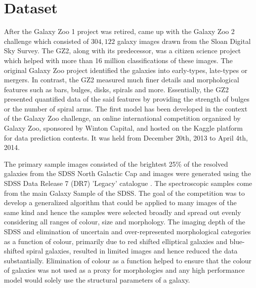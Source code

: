 \documentclass[fleqn,usenatbib]{mnras}
\begin{document}
\section{Dataset}
\hspace{0.25 in}After the Galaxy Zoo 1 \citep{2008MNRAS.389.1179L} project was retired, \citet{Willett_2013} came up with the Galaxy Zoo 2 challenge which consisted of $304,122$ galaxy images drawn from the Sloan Digital Sky Survey. The GZ2, along with its predecessor, was a citizen science project which helped with more than 16 million classifications of these images. The original Galaxy Zoo project identified the galaxies into early-types, late-types or mergers. In contrast, the GZ2 measured much finer details and morphological features such as bars, bulges, disks, spirals and more. Essentially, the GZ2 presented quantified data of the said features by providing the strength of bulges or the number of spiral arms. The first model has been developed in the context of the Galaxy Zoo challenge, an online international competition organized by Galaxy Zoo, sponsored by Winton Capital, and hosted on the Kaggle platform for data prediction contests. It was held from December 20th, 2013 to April 4th, 2014. 

The primary sample images consisted of the brightest 25\% of the resolved galaxies from the SDSS North Galactic Cap and images were generated using the SDSS Data Release 7 (DR7) 'Legacy' catalogue \citep{Abazajian2009}. The spectroscopic samples come from the main Galaxy Sample of the SDSS. The goal of the competition was to develop a generalized algorithm that could be applied to many images of the same kind and hence the samples were selected broadly and spread out evenly considering all ranges of colour, size and morphology. The imaging depth of the SDSS and elimination of uncertain and over-represented morphological categories as a function of colour, primarily due to red shifted elliptical galaxies and blue-shifted spiral galaxies, resulted in limited images and hence reduced the data substantially. Elimination of colour as a function helped to ensure that the colour of galaxies was not used as a proxy for morphologies and any high performance model would solely use the structural parameters of a galaxy. 
\end{document}
